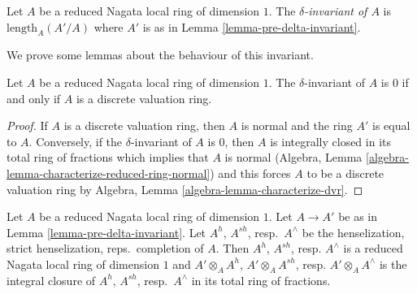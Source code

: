 \begin{definition}
\label{definition-delta-invariant-algebra}
Let $A$ be a reduced Nagata local ring of dimension $1$.
The {\it $\delta$-invariant of $A$} is $\text{length}_A(A'/A)$
where $A'$ is as in Lemma \ref{lemma-pre-delta-invariant}.
\end{definition}

\noindent
We prove some lemmas about the behaviour of this invariant.

\begin{lemma}
\label{lemma-delta-invariant-is-zero}
Let $A$ be a reduced Nagata local ring of dimension $1$.
The $\delta$-invariant of $A$ is $0$ if and only if
$A$ is a discrete valuation ring.
\end{lemma}

\begin{proof}
If $A$ is a discrete valuation ring, then $A$ is normal and
the ring $A'$ is equal to $A$. Conversely, if the
$\delta$-invariant of $A$ is $0$, then $A$ is integrally
closed in its total ring of fractions which implies that
$A$ is normal
(Algebra, Lemma \ref{algebra-lemma-characterize-reduced-ring-normal})
and this forces $A$ to be a discrete valuation ring by
Algebra, Lemma \ref{algebra-lemma-characterize-dvr}.
\end{proof}

\begin{lemma}
\label{lemma-normalization-same-after-completion}
Let $A$ be a reduced Nagata local ring of dimension $1$.
Let $A \to A'$ be as in Lemma \ref{lemma-pre-delta-invariant}.
Let $A^h$, $A^{sh}$, resp.\ $A^\wedge$
be the henselization, strict henselization, reps.\ completion of $A$.
Then $A^h$, $A^{sh}$, resp. $A^\wedge$ is a reduced Nagata local
ring of dimension $1$ and
$A' \otimes_A A^h$, $A' \otimes_A A^{sh}$, resp. $A' \otimes_A A^\wedge$
is the integral closure of $A^h$, $A^{sh}$, resp.\ $A^\wedge$
in its total ring of fractions.
\end{lemma}

